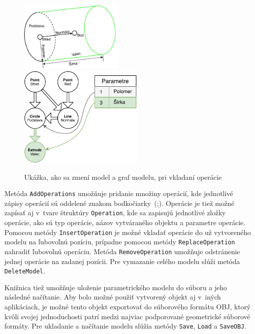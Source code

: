 \begin{figure}[H]
	\centering
	\includegraphics[align=c,width=0.45\textwidth]{obrazky-figures/Examples/DP Navrh operacii-Page-AddOperation model.pdf}
	\includegraphics[align=c,width=0.54\textwidth]{obrazky-figures/Examples/DP Navrh operacii-Page-AddOperation Graph.pdf}
	\caption{Ukážka, ako sa zmení model a graf modelu, pri vkladaní operácie}
	\label{fig:addOperation}
\end{figure}



Metóda \texttt{AddOperations} umožňuje pridanie množiny operácií, kde jednotlivé zápisy operácií sú oddelené znakom bodkočiarky~(;).  Operácie je tiež možné zapísať aj v~tvare štruktúry \texttt{Operation}, kde sa zapisujú jednotlivé zložky operácie, ako sú typ operácie, názov vytváraného objektu a parametre operácie.
Pomocou metódy \texttt{InsertOperation} je možné vkladať operácie do už vytvoreného modelu na ľubovoľnú pozíciu, prípadne pomocou metódy \texttt{ReplaceOperation} nahradiť ľubovoľnú operáciu. 
Metóda \texttt{RemoveOperation} umožňuje odstránenie jednej operácie na zadanej pozícii. Pre vymazanie celého modelu slúži metóda \texttt{DeleteModel}. 


Knižnica tiež umožňuje uloženie parametrického modelu do  súboru a jeho následné načítanie. Aby bolo možné použiť vytvorený objekt aj v~iných aplikáciach, je možné tento objekt exportovať do súborového formátu OBJ, ktorý kvôli svojej jednoduchosti patrí medzi najviac podporované geometrické súborové formáty. Pre ukladanie a načítanie modelu slúžia metódy \texttt{Save}, \texttt{Load} a \texttt{SaveOBJ}.

